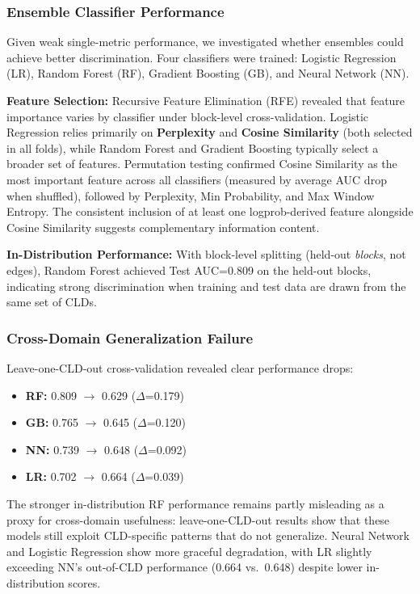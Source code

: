 \subsubsection{Ensemble Classifier Performance}

Given weak single-metric performance, we investigated whether ensembles could achieve better discrimination. Four classifiers were trained: Logistic Regression (LR), Random Forest (RF), Gradient Boosting (GB), and Neural Network (NN).

\textbf{Feature Selection:} Recursive Feature Elimination (RFE) revealed that feature importance varies by classifier under block-level cross-validation. Logistic Regression relies primarily on \textbf{Perplexity} and \textbf{Cosine Similarity} (both selected in all folds), while Random Forest and Gradient Boosting typically select a broader set of features. Permutation testing confirmed Cosine Similarity as the most important feature across all classifiers (measured by average AUC drop when shuffled), followed by Perplexity, Min Probability, and Max Window Entropy. The consistent inclusion of at least one logprob-derived feature alongside Cosine Similarity suggests complementary information content.

\textbf{In-Distribution Performance:} With block-level splitting (held-out \textit{blocks}, not edges), Random Forest achieved Test AUC=0.809 on the held-out blocks, indicating strong discrimination when training and test data are drawn from the same set of CLDs.

\subsubsection{Cross-Domain Generalization Failure}

Leave-one-CLD-out cross-validation revealed clear performance drops:
\begin{itemize}[noitemsep]
    \item \textbf{RF:} 0.809 $\rightarrow$ 0.629 ($\Delta$=0.179)
    \item \textbf{GB:} 0.765 $\rightarrow$ 0.645 ($\Delta$=0.120)
    \item \textbf{NN:} 0.739 $\rightarrow$ 0.648 ($\Delta$=0.092)
    \item \textbf{LR:} 0.702 $\rightarrow$ 0.664 ($\Delta$=0.039)
\end{itemize}

The stronger in-distribution RF performance remains partly misleading as a proxy for cross-domain usefulness: leave-one-CLD-out results show that these models still exploit CLD-specific patterns that do not generalize. Neural Network and Logistic Regression show more graceful degradation, with LR slightly exceeding NN's out-of-CLD performance (0.664 vs.\ 0.648) despite lower in-distribution scores.

